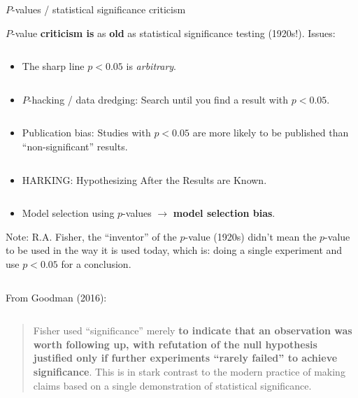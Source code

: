 \documentclass[
  10pt,
  ignorenonframetext,
]{beamer}
\providecommand{\tightlist}{%
  \setlength{\itemsep}{0pt}\setlength{\parskip}{0pt}}
\begin{document}
\begin{frame}
\begin{block}{\(P\)-values / statistical significance criticism}
\protect\hypertarget{p-values-statistical-significance-criticism}{}
\(~\)

\(P\)-value \textbf{criticism is} as \textbf{old} as statistical
significance testing (1920s!). Issues:

\(~\)

\begin{itemize}
\tightlist
\item
  The sharp line \(p<0.05\) is \emph{arbitrary}.
\end{itemize}

\(~\)

\begin{itemize}
\tightlist
\item
  \(P\)-hacking / data dredging: Search until you find a result with
  \(p<0.05\).
\end{itemize}

\(~\)

\begin{itemize}
\tightlist
\item
  Publication bias: Studies with \(p<0.05\) are more likely to be
  published than ``non-significant'' results.
\end{itemize}

\(~\)

\begin{itemize}
\tightlist
\item
  HARKING: Hypothesizing After the Results are Known.
\end{itemize}

\(~\)

\begin{itemize}
\tightlist
\item
  Model selection using \(p\)-values \(\rightarrow\) \textbf{model
  selection bias}.
\end{itemize}
\end{block}
\end{frame}

\begin{frame}
Note: R.A. Fisher, the ``inventor'' of the \(p\)-value (1920s) didn't
mean the \(p\)-value to be used in the way it is used today, which is:
doing a single experiment and use \(p<0.05\) for a conclusion.

\(~\)

From Goodman (2016):

\(~\)

\begin{quote}
Fisher used ``significance'' merely \textbf{to indicate that an
observation was worth following up, with refutation of the null
hypothesis justified only if further experiments ``rarely failed'' to
achieve significance}. This is in stark contrast to the modern practice
of making claims based on a single demonstration of statistical
significance.
\end{quote}

\(~\)

\pause

\centering
\end{frame}
\end{document}
